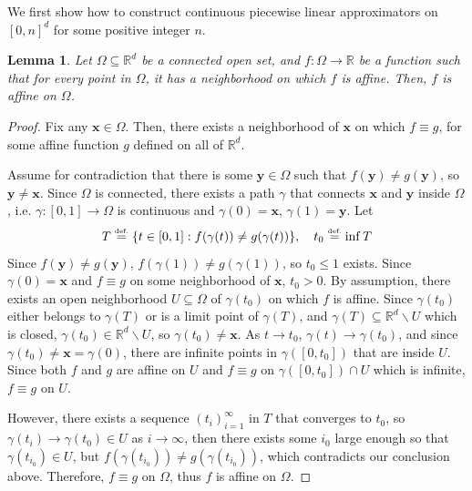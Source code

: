 \documentclass{article}
\numberwithin{equation}{section}
\newtheorem{lemma}{Lemma}[section]
\theoremstyle{definition}
\newcommand{\eqdef}{\ensuremath{\stackrel{\mbox{\upshape\tiny def.}}{=}}}
\begin{document}
We first show how to construct continuous piecewise linear approximators on $[0,n]^d$ for some positive integer $n$.

\begin{lemma}
\label{lem:local_affine_implies_global_affine}
    Let $\Omega\subseteq\mathbb{R}^d$ be a connected open set, and $f:\Omega\rightarrow\mathbb{R}$ be a function such that for every point in $\Omega$, it has a neighborhood on which $f$ is affine. Then, $f$ is affine on $\Omega$.
\end{lemma}

\begin{proof}
Fix any $\mathbf{x}\in\Omega$. Then, there exists a neighborhood of $\mathbf{x}$ on which $f\equiv g$, for some affine function $g$ defined on all of $\mathbb{R}^d$.

Assume for contradiction that there is some $\mathbf{y}\in\Omega$ such that $f(\mathbf{y})\ne g(\mathbf{y})$, so $\mathbf{y}\ne \mathbf{x}$. Since $\Omega$ is connected, there exists a path $\gamma$ that connects $\mathbf{x}$ and $\mathbf{y}$ inside $\Omega$, i.e. $\gamma:[0,1]\rightarrow\Omega$ is continuous and $\gamma(0)=\mathbf{x}$, $\gamma(1)=\mathbf{y}$. Let
\[
    T \eqdef \{ t\in[0,1]: f(\gamma(t)) \ne g(\gamma(t)) \},
    \quad
    t_0 \eqdef \inf T
\]
Since $f(\mathbf{y})\ne g(\mathbf{y})$, $f(\gamma(1))\ne g(\gamma(1))$, so $t_0\le 1$ exists. Since $\gamma(0)=\mathbf{x}$ and $f\equiv g$ on some neighborhood of $\mathbf{x}$, $t_0>0$. By assumption, there exists an open neighborhood $U\subseteq\Omega$ of $\gamma(t_0)$ on which $f$ is affine. Since $\gamma(t_0)$ either belongs to $\gamma(T)$ or is a limit point of $\gamma(T)$, and $\gamma(T)\subseteq\mathbb{R}^d\backslash U$ which is closed, $\gamma(t_0)\in\mathbb{R}^d\backslash U$, so $\gamma(t_0)\ne \mathbf{x}$. As $t\rightarrow t_0$, $\gamma(t)\rightarrow\gamma(t_0)$, and since $\gamma(t_0)\ne\mathbf{x}=\gamma(0)$, there are infinite points in $\gamma([0,t_0])$ that are inside $U$. Since both $f$ and $g$ are affine on $U$ and $f\equiv g$ on $\gamma([0,t_0])\cap U$ which is infinite, $f\equiv g$ on $U$. 

However, there exists a sequence $(t_i)_{i=1}^{\infty}$ in $T$ that converges to $t_0$, so $\gamma(t_i)\rightarrow\gamma(t_0)\in U$ as $i\rightarrow\infty$, then there exists some $i_0$ large enough so that $\gamma(t_{i_0})\in U$, but $f(\gamma(t_{i_0})) \ne g(\gamma(t_{i_0}))$, which contradicts our conclusion above.
Therefore, $f\equiv g$ on $\Omega$, thus $f$ is affine on $\Omega$.
\end{proof}
\end{document}
